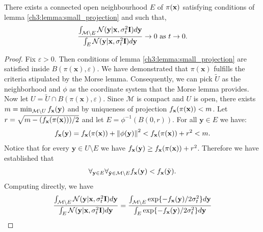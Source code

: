 \begin{lemma}
\label{ch3:lemma:gaussian_concentration}
    There exists a connected open neighbourhood $E$ of $\pi(\textup{\textbf{x}})$ satisfying conditions of lemma \ref{ch3:lemma:small_projection} and such that, 
    \begin{gather}
        \frac{\int_{\mathcal{M} \setminus E}\mathcal{N}(\textup{\textbf{y}} | \textup{\textbf{x}}, \sigma^2_t\textup{\textbf{I}}) d\textup{\textbf{y}}}{ \int_E \mathcal{N}(\textup{\textbf{y}} | \textup{\textbf{x}}, \sigma^2_t\textup{\textbf{I}}) d\textup{\textbf{y}}} \to 0 \text{ as } t \to 0. 
    \end{gather}
\end{lemma}
\begin{proof}
Fix $\varepsilon > 0$. Then conditions of lemma \ref{ch3:lemma:small_projection} are satisfied inside $B(\pi(\textbf{x}), \varepsilon)$. We have demonstrated that $\pi(\textbf{x})$ fulfills the criteria stipulated by the Morse lemma. Consequently, we can pick $\tilde{U}$ as the neighborhood and $\phi$ as the coordinate system that the Morse lemma provides. Now let $U = \tilde{U} \cap B(\pi(\textbf{x}), \varepsilon)$. Since $\mathcal{M}$ is compact and $U$ is open, there exists $m = \min_{\mathcal{M} \setminus U} f_\textup{\textbf{x}}(\textbf{y})$ and by uniqueness of projection $f_\textup{\textbf{x}}(\pi(\textbf{x})) < m$. 
Let $r= \sqrt{m - (f_\textup{\textbf{x}}(\pi(\textbf{x}))) / 2}$ and let $E = \phi^{-1}(B(0, r))$. For all $\textbf{y} \in E$ we have:
$$f_\textup{\textbf{x}}(\textbf{y}) = f_\textup{\textbf{x}}(\pi(\textbf{x})) + \left\lVert \phi(\textbf{y}) \right\rVert^2 <   f_\textup{\textbf{x}}(\pi(\textbf{x})) + r^2 < m.$$ 
Notice that for every $\textbf{y} \in U \setminus E$ we have $f_\textup{\textbf{x}}(\textbf{y}) \geq f_\textup{\textbf{x}}(\pi(\textbf{x})) + r^2$. Therefore we have established that
\begin{gather}
\label{ch3:eq:less}
   \forall_{\textbf{y} \in E} \forall_{\tilde{\textbf{y}} \in \mathcal{M} \setminus E } f_\textup{\textbf{x}}(\textbf{y}) < f_\textup{\textbf{x}}(\tilde{\textbf{y}}). 
\end{gather}
Computing directly, we have   
\begin{gather}
\label{ch3:eq:normals2}
    \frac{\int_{\mathcal{M} \setminus E}\mathcal{N}(\textbf{y} | \textbf{x}, \sigma^2_t\textbf{I}) d\textbf{y}}{ \int_E \mathcal{N}(\textbf{y} | \textbf{x}, \sigma^2_t\textbf{I}) d\textbf{y}}
    = \frac{\int_{\mathcal{M} \setminus E} \exp\{{-f_\textup{\textbf{x}}(\textbf{y})/2\sigma_t^2}\} d\textbf{y}}{ \int_E \exp \{{-f_\textup{\textbf{x}}(\textbf{y})/2\sigma_t^2} \}d\textbf{y}} 

\end{gather}
\end{proof}
